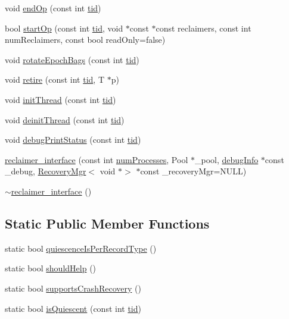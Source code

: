\begin{DoxyCompactItemize}
void \hyperlink{classreclaimer__interface_a913e054b17192c9c905469a19eb7dbd4}{end\+Op} (const int \hyperlink{microbench_2main_8cpp_a9ca9869868fe7e7a38a921cc7de4103f}{tid})
\item 
bool \hyperlink{classreclaimer__interface_a99471b7a8f06a80d81896e269ea63cc9}{start\+Op} (const int \hyperlink{microbench_2main_8cpp_a9ca9869868fe7e7a38a921cc7de4103f}{tid}, void $\ast$const $\ast$const reclaimers, const int num\+Reclaimers, const bool read\+Only=false)
\item 
void \hyperlink{classreclaimer__interface_aa3a2771a4002d59cf81ef86921d499ca}{rotate\+Epoch\+Bags} (const int \hyperlink{microbench_2main_8cpp_a9ca9869868fe7e7a38a921cc7de4103f}{tid})
\item 
void \hyperlink{classreclaimer__interface_a0ef47251c6a7fbd543354b88db8aa309}{retire} (const int \hyperlink{microbench_2main_8cpp_a9ca9869868fe7e7a38a921cc7de4103f}{tid}, T $\ast$p)
\item 
void \hyperlink{classreclaimer__interface_a0fa3f1bddb187e68931f0792fbba812c}{init\+Thread} (const int \hyperlink{microbench_2main_8cpp_a9ca9869868fe7e7a38a921cc7de4103f}{tid})
\item 
void \hyperlink{classreclaimer__interface_a18e0cfdbf69e359ceab660df99ef4d4a}{deinit\+Thread} (const int \hyperlink{microbench_2main_8cpp_a9ca9869868fe7e7a38a921cc7de4103f}{tid})
\item 
void \hyperlink{classreclaimer__interface_aa8cd8a18adb4da97d35e60c139dfc4fb}{debug\+Print\+Status} (const int \hyperlink{microbench_2main_8cpp_a9ca9869868fe7e7a38a921cc7de4103f}{tid})
\item 
\hyperlink{classreclaimer__interface_a63ff07ec643f85a3c2b8152183f37882}{reclaimer\+\_\+interface} (const int \hyperlink{testing_8cpp_aa085812188e21ede75351d88b9b2c30d}{num\+Processes}, Pool $\ast$\+\_\+pool, \hyperlink{classdebugInfo}{debug\+Info} $\ast$const \+\_\+debug, \hyperlink{classRecoveryMgr}{Recovery\+Mgr}$<$ void $\ast$$>$ $\ast$const \+\_\+recovery\+Mgr=N\+U\+LL)
\item 
\hyperlink{classreclaimer__interface_aef907bda3f068a00c9a15f0d51962930}{$\sim$reclaimer\+\_\+interface} ()
\end{DoxyCompactItemize}
\subsection*{Static Public Member Functions}
\begin{DoxyCompactItemize}
\item 
static bool \hyperlink{classreclaimer__interface_a3b93587337b561201d7fa8ab36f64d9d}{quiescence\+Is\+Per\+Record\+Type} ()
\item 
static bool \hyperlink{classreclaimer__interface_af20ec23a47f79d303a18551fd8706f2d}{should\+Help} ()
\item 
static bool \hyperlink{classreclaimer__interface_a965d5fd618ce50fb9a5db0d6e4a8dc9e}{supports\+Crash\+Recovery} ()
\item 
static bool \hyperlink{classreclaimer__interface_a8434d6efc52667ddd3c6738733c79db8}{is\+Quiescent} (const int \hyperlink{microbench_2main_8cpp_a9ca9869868fe7e7a38a921cc7de4103f}{tid})
\end{DoxyCompactItemize}
